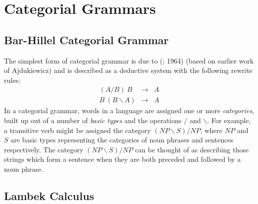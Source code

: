 \section{Categorial Grammars}
\label{syntax-background-section}


\subsection{Bar-Hillel Categorial Grammar}

The simplest form of categorial grammar is due to \citeauthor{Bar-Hillel:50} (\citeyear{Bar-Hillel:50};\citeyear{Bar-Hillel:64} 1964) (based on earlier work of Ajdukiewicz) and is described as a deductive system with the following rewrite rules:
\begin{eqnarray*}
(A/B)\ B &\rightarrow& A\\
B\ (B\backslash A) &\rightarrow& A
\end{eqnarray*}
In a categorial grammar, words in a language are assigned one or more \emph{categories}, built up out of a number of \emph{basic types} and the operations $/$ and $\backslash$. For example, a transitive verb might be assigned the category $(\mathit{NP}\backslash S)/\mathit{NP}$, where $\mathit{NP}$ and $S$ are basic types representing the categories of noun phrases and sentences respectively. The category $(\mathit{NP}\backslash S)/\mathit{NP}$ can be thought of as describing those strings which form a sentence when they are both preceded and followed by a noun phrase.

\subsection{Lambek Calculus}

